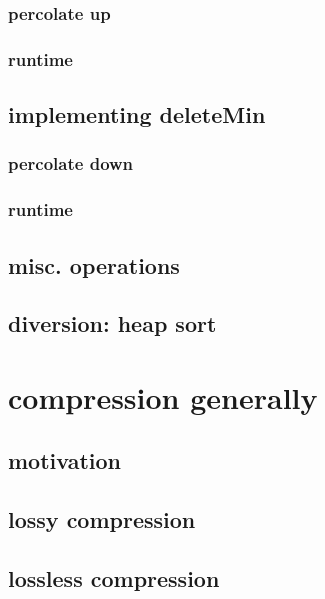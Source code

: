 

\subsubsection{percolate up}

\subsubsection{runtime}

\subsection{implementing deleteMin}

\subsubsection{percolate down}

\subsubsection{runtime}

\subsection{misc. operations}

\subsection{diversion: heap sort}

\section{compression generally} 

\subsection{motivation}

\subsection{lossy compression}

\subsection{lossless compression}

